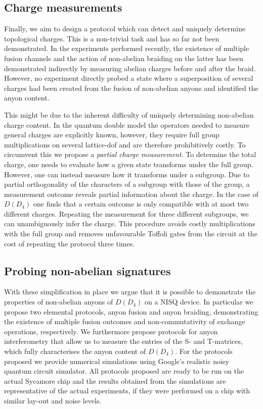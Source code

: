 \documentclass[a4paper,twocolumn,11pt]{quantumarticle}
\begin{document}
\subsection{Charge measurements}
Finally, we aim to design a protocol which can detect and uniquely determine topological charges. This is a non-trivial task and has so far not been demonstrated. In the experiments performed recently, the existence of multiple fusion channels and the action of non-abelian braiding on the latter has been demonstrated indirectly by measuring abelian charges before and after the braid. However, no experiment directly probed a state where a superposition of several charges had been created from the fusion of non-abelian anyons and identified the anyon content. 


This might be due to the inherent difficulty of uniquely determining non-abelian charge content. In the quantum double model the operators needed to measure general charges are explicitly known, however, they require full group multiplications on several lattice-dof and are therefore prohibitively costly. To circumvent this we propose a \emph{partial charge measurement}. To determine the total charge, one needs to evaluate how a given state transforms under the full group. However, one can instead measure how it transforms under a subgroup. Due to partial orthogonality of the characters of a subgroup with those of the group, a measurement outcome reveals partial information about the charge. In the case of $D(D_4)$ one finds that a certain outcome is only compatible with at most two different charges. Repeating the measurement for three different subgroups, we can unambiguously infer the charge. This procedure avoids costly multiplications with the full group and removes unfavourable Toffoli gates from the circuit at the cost of repeating the protocol three times.



\subsection{Probing non-abelian signatures}
With these simplification in place we argue that it is possible to demonstrate the properties of non-abelian anyons of $D(D_4)$ on a NISQ device. In particular we propose two elemental protocols, anyon fusion and anyon braiding, demonstrating the existence of multiple fusion outcomes and non-commutativity of exchange operations, respectively. We furthermore propose protocols for anyon interferometry that allow us to measure the entries of the S- and T-matrices, which fully characterises the anyon content of $D(D_4)$. For the protocols proposed we provide numerical simulations using Google's realistic noisy quantum circuit simulator. All protocols proposed are ready to be run on the actual Sycamore chip and the results obtained from the simulations are representative of the actual experiments, if they were performed on a chip with similar lay-out and noise levels. 
\end{document}

